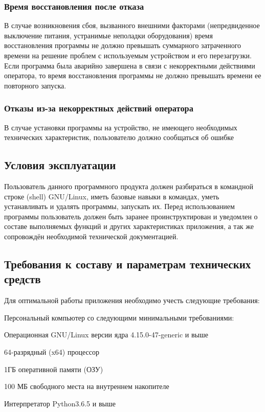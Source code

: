 \subsubsection{Время восстановления после отказа}
В случае возникновения сбоя, вызванного внешними факторами (непредвиденное
выключение питания, устранимые неполадки оборудования) время восстановления
программы не должно превышать суммарного затраченного времени на решение
проблем с используемым устройством и его перезагрузки. Если программа была
аварийно завершена в связи с некорректными действиями оператора, то время
восстановления программы не должно превышать времени ее повторного запуска.

\subsubsection{Отказы из-за некорректных действий оператора}
В случае установки программы на устройство, не имеющего необходимых технических
характеристик, пользователю должно сообщаться об ошибке

\subsection{Условия эксплуатации}
Пользователь данного программного продукта должен разбираться в командной
строке (shell) GNU/Linux, иметь базовые навыки в командах, уметь устанавливать
и удалять программы, запускать их. Перед использованием программы
пользователь должен быть заранее проинструктирован и уведомлен о составе
выполняемых функций и других характеристиках приложения, а так же сопровождён
необходимой технической документацией.

\subsection{Требования к составу и параметрам технических средств}
Для оптимальной работы приложения необходимо учесть следующие требования:
\begin{my_enumerate}
    \item Персональный компьютер со следующими минимальными требованиями:
        \begin{my_enumerate}
            \item Операционная GNU/Linux версии ядра 4.15.0-47-generic и выше
            \item 64-разрядный (x64) процессор
            \item 1ГБ оперативной памяти (ОЗУ)
            \item 100 МБ свободного места на внутреннем накопителе
        \end{my_enumerate}
    \item Интерпретатор Python3.6.5 и выше
\end{my_enumerate}

